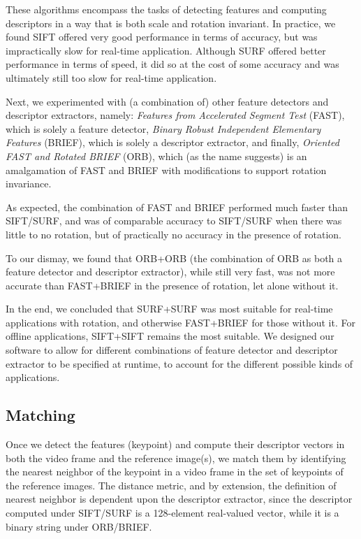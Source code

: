 \documentclass[11pt]{article} %
\theoremstyle{plain}
\theoremstyle{definition}
\theoremstyle{remark}
\numberwithin{equation}{section} %
\numberwithin{figure}{section} %
\numberwithin{table}{section} %
\begin{document}
These algorithms encompass the tasks of detecting features and computing descriptors
in a way that is both scale and rotation invariant. In practice, we found SIFT offered
very good performance in terms of accuracy, but was impractically slow for real-time 
application. Although SURF offered better performance in terms of speed, it did so at
the cost of some accuracy and was ultimately still too slow for real-time application.

Next, we experimented with (a combination of) other feature detectors and descriptor 
extractors, namely: \emph{Features from Accelerated Segment Test} \citep{Rosten2006} (FAST), 
which is solely a feature detector, \emph{Binary Robust Independent Elementary Features} 
\citep{Calonder2010} (BRIEF), which is solely a descriptor extractor, and finally, 
\emph{Oriented FAST and Rotated BRIEF} \citep{Rublee2011} (ORB), which (as the name suggests) 
is an amalgamation of FAST and BRIEF with modifications to support rotation invariance.

As expected, the combination of FAST and BRIEF performed much faster than SIFT/SURF,
and was of comparable accuracy to SIFT/SURF when there was little to no rotation, but
of practically no accuracy in the presence of rotation. 

To our dismay, we found that ORB+ORB (the combination of ORB as both a feature detector 
and descriptor extractor), while still very fast, was not more accurate than FAST+BRIEF 
in the presence of rotation, let alone without it.

In the end, we concluded that SURF+SURF was most suitable for real-time applications with
rotation, and otherwise FAST+BRIEF for those without it. For offline applications,
SIFT+SIFT remains the most suitable. We designed our software to allow for different  
combinations of feature detector and descriptor extractor to be specified at runtime,
to account for the different possible kinds of applications.

\subsection{Matching}

Once we detect the features (keypoint) and compute their descriptor vectors in both the 
video frame and the reference image(s), we match them by identifying the nearest neighbor 
of the keypoint in a video frame in the set of keypoints of the reference images. The
distance metric, and by extension, the definition of nearest neighbor is dependent upon the 
descriptor extractor, since the descriptor computed under SIFT/SURF is a 128-element 
real-valued vector, while it is a binary string under ORB/BRIEF.
\end{document}
